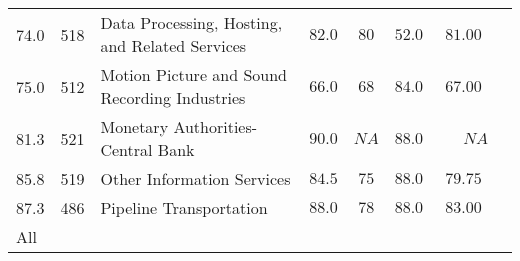 \documentclass[9pt, oneside]{article}   	%
\begin{document}
\begin{longtable}{lcp{3 in}ccccc}
74.0  & 518 & Data Processing, Hosting, and Related Services & $82.0$ & $80$ & $52.0$ & $81.00$ \\
75.0  & 512 & Motion Picture and Sound Recording Industries & $66.0$ & $68$ & $84.0$ & $67.00$ \\
81.3  & 521 & Monetary Authorities-Central Bank & $90.0$ & $NA$ & $88.0$ & $\phantom{000}NA$ \\
85.8  & 519 & Other Information Services & $84.5$ & $75$ & $88.0$ & $79.75$ \\
87.3  & 486 & Pipeline Transportation & $88.0$ & $78$ & $88.0$ & $83.00$ \\
\cline{1-1} \cline{2-2} \cline{3-3} \cline{4-4} \cline{5-5} \cline{6-6} \cline{7-7} \cline{8-8} %

All  & & &  &  &  &  \\
\hline 
\end{longtable}







\pagebreak
\end{document}
